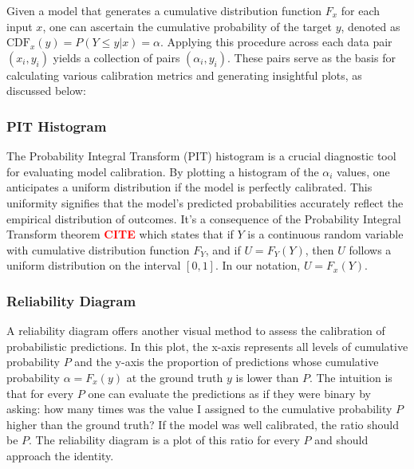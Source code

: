 \documentclass{article}
\newcommand{\citee}[1]{\textbf{\textcolor{red}{CITE}}}
\begin{document}
Given a model that generates a cumulative distribution function $F_x$ for each input $x$, one can ascertain the cumulative probability of the target $y$, denoted as $\text{CDF}_x(y) = P(Y \leq y|x) = \alpha$. Applying this procedure across each data pair $(x_i, y_i)$ yields a collection of pairs $(\alpha_i, y_i)$. These pairs serve as the basis for calculating various calibration metrics and generating insightful plots, as discussed below:

\subsubsection{PIT Histogram}
The Probability Integral Transform (PIT) histogram is a crucial diagnostic tool for evaluating model calibration. By plotting a histogram of the $\alpha_i$ values, one anticipates a uniform distribution if the model is perfectly calibrated. This uniformity signifies that the model's predicted probabilities accurately reflect the empirical distribution of outcomes. It's a consequence of the Probability Integral Transform theorem \citee, which states that if $Y$ is a continuous random variable with cumulative distribution function $F_Y$, and if $U = F_Y(Y)$, then $U$ follows a uniform distribution on the interval $[0,1]$.
In our notation, $U = F_x(Y)$.


\subsubsection{Reliability Diagram}
A reliability diagram offers another visual method to assess the calibration of probabilistic predictions. In this plot, the x-axis represents all levels of cumulative probability $P$ and the y-axis the proportion of predictions whose cumulative probability $\alpha=F_x(y)$ at the ground truth $y$ is lower than $P$. The intuition is that for every $P$ one can evaluate the predictions as if they were binary by asking: how many times was the value I assigned to the cumulative probability $P$ higher than the ground truth? If the model was well calibrated, the ratio should be $P$. The reliability diagram is a plot of this ratio for every $P$ and should approach the identity.
\end{document}
